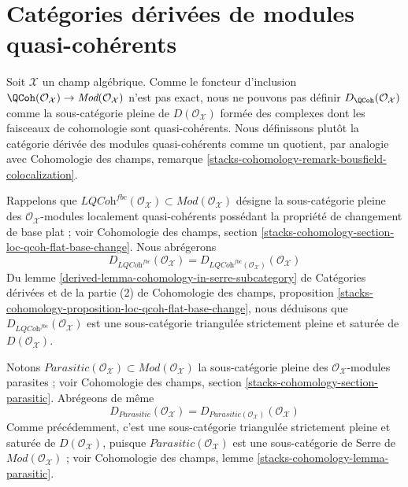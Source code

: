 \section{Catégories dérivées de modules quasi-cohérents}
\label{section-derived}

\noindent
Soit $\mathcal{X}$ un champ algébrique. Comme le foncteur d'inclusion
$\QCoh(\mathcal{O}_\mathcal{X}) \to
\textit{Mod}(\mathcal{O}_\mathcal{X})$ n'est pas exact, nous ne pouvons pas
définir $D_\QCoh(\mathcal{O}_\mathcal{X})$ comme la sous-catégorie pleine de
$D(\mathcal{O}_\mathcal{X})$ formée des complexes dont les faisceaux de
cohomologie sont quasi-cohérents. Nous définissons plutôt la catégorie dérivée
des modules quasi-cohérents comme un quotient, par analogie avec Cohomologie
des champs, remarque
\ref{stacks-cohomology-remark-bousfield-colocalization}.

\medskip\noindent
Rappelons que $\textit{LQCoh}^{fbc}(\mathcal{O}_\mathcal{X}) \subset
\textit{Mod}(\mathcal{O}_\mathcal{X})$ désigne la sous-catégorie pleine des
$\mathcal{O}_\mathcal{X}$-modules localement quasi-cohérents possédant la
propriété de changement de base plat ; voir Cohomologie des champs, section
\ref{stacks-cohomology-section-loc-qcoh-flat-base-change}.
Nous abrégerons
$$
D_{\textit{LQCoh}^{fbc}}(\mathcal{O}_\mathcal{X}) =
D_{\textit{LQCoh}^{fbc}(\mathcal{O}_\mathcal{X})}(\mathcal{O}_\mathcal{X})
$$
Du lemme \ref{derived-lemma-cohomology-in-serre-subcategory} de Catégories
dérivées et de la partie (2) de Cohomologie des champs, proposition
\ref{stacks-cohomology-proposition-loc-qcoh-flat-base-change}, nous déduisons
que $D_{\textit{LQCoh}^{fbc}}(\mathcal{O}_\mathcal{X})$ est une sous-catégorie
triangulée strictement pleine et saturée de
$D(\mathcal{O}_\mathcal{X})$.

\medskip\noindent
Notons $\textit{Parasitic}(\mathcal{O}_\mathcal{X}) \subset
\textit{Mod}(\mathcal{O}_\mathcal{X})$ la sous-catégorie pleine des
$\mathcal{O}_\mathcal{X}$-modules parasites ; voir Cohomologie des champs,
section
\ref{stacks-cohomology-section-parasitic}.
Abrégeons de même
$$
D_{\textit{Parasitic}}(\mathcal{O}_\mathcal{X}) =
D_{\textit{Parasitic}(\mathcal{O}_\mathcal{X})}(\mathcal{O}_\mathcal{X})
$$
Comme précédemment, c'est une sous-catégorie triangulée strictement pleine et
saturée de $D(\mathcal{O}_\mathcal{X})$, puisque
$\textit{Parasitic}(\mathcal{O}_\mathcal{X})$ est une sous-catégorie de Serre
de $\textit{Mod}(\mathcal{O}_\mathcal{X})$ ; voir Cohomologie des champs, lemme
\ref{stacks-cohomology-lemma-parasitic}.

